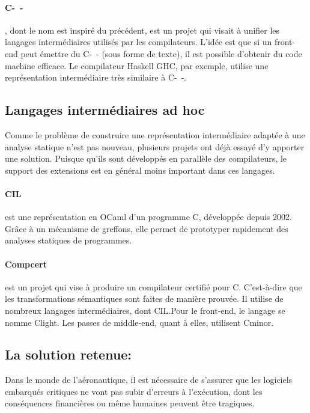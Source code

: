 \paragraph{C-~-}\cite{spjcmm} , dont le nom est inspiré du précédent,
est un projet qui visait à unifier les langages intermédiaires utilisés par les
compilateurs. L'idée est que si un front-end peut émettre du C-~- (sous forme de
texte), il est possible d'obtenir du code machine efficace. Le compilateur
Haskell GHC, par exemple, utilise une représentation intermédiaire très
similaire à C-~-.

\subsection*{Langages intermédiaires ad hoc}

Comme le problème de construire une représentation intermédiaire adaptée à une
analyse statique n'est pas nouveau, plusieurs projets ont déjà essayé d'y
apporter une solution. Puisque qu'ils sont développés en parallèle des
compilateurs, le support des extensions est en général moins important dans ces
langages.

\paragraph{CIL}\cite{NeculaCil}  est une représentation en
OCaml d'un programme C, développée depuis 2002. Grâce à un mécanisme de
greffons, elle permet de prototyper rapidement des analyses statiques de
programmes.

\paragraph{Compcert} est un projet qui vise à produire un compilateur certifié
pour C. C'est-à-dire que les transformations sémantiques sont faites de manière
prouvée. Il utilise de nombreux langages intermédiaires, dont CIL.\@ Pour le
front-end, le langage se nomme Clight\cite{cfront}. Les passes de middle-end,
quant à elles, utilisent Cminor\cite{cminorSL}.

\subsection*{La solution retenue: \langname{}}

Dans le monde de l'aéronautique, il est nécessaire de s'assurer que les
logiciels embarqués critiques ne vont pas subir d'erreurs à l'exécution, dont
les conséquences financières ou même humaines peuvent être tragiques.

